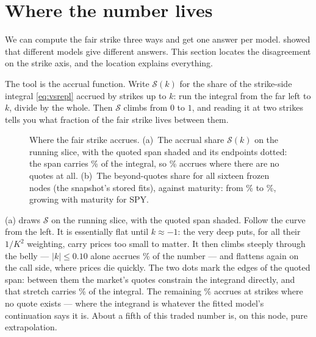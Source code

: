 \section{Where the number lives}
\label{sec:vslives}

We can compute the fair strike three ways and get one answer per
model.   showed that different models give different
answers.  This section locates the disagreement on the strike axis,
and the location explains everything.

The tool is the accrual function.  Write $\mathcal{S}(k)$ for the
share of the strike-side integral \eqref{eq:vsrepl} accrued by strikes
up to $k$: run the integral from the far left to $k$, divide by the
whole.  Then $\mathcal{S}$ climbs from $0$ to $1$, and reading it at
two strikes tells you what fraction of the fair strike lives between
them.

\begin{figure}[htbp]
\centering
{}
\caption{Where the fair strike accrues.  (a)~The accrual share
$\mathcal{S}(k)$ on the running slice, with the quoted span shaded and
its endpoints dotted: the span carries \MacVsShareQuotedPct\% of the
integral, so \MacVsShareBeyondPct\% accrues where there are no quotes
at all.  (b)~The beyond-quotes share for all sixteen frozen nodes
(the snapshot's stored fits), against maturity: from
\MacVsShareGalleryMinPct\% to \MacVsShareGalleryMaxPct\%, growing with
maturity for SPY.}
\label{fig:vsshare}
\end{figure}

(a) draws $\mathcal{S}$ on the running slice, with
the quoted span shaded.  Follow the curve from the left.  It is
essentially flat until $k\approx-1$: the very deep puts, for all their
$1/K^{2}$ weighting, carry prices too small to matter.  It then climbs
steeply through the belly --- $|k|\le0.10$ alone accrues
\MacVsShareAtmPct\% of the number --- and flattens again on the call
side, where prices die quickly.  The two dots mark the edges of the
quoted span: between them the market's quotes constrain the integrand
directly, and that stretch carries \MacVsShareQuotedPct\% of the
integral.  The remaining \MacVsShareBeyondPct\% accrues at strikes
where no quote exists --- where the integrand is whatever the fitted
model's continuation says it is.  About a fifth of this traded number
is, on this node, pure extrapolation.

